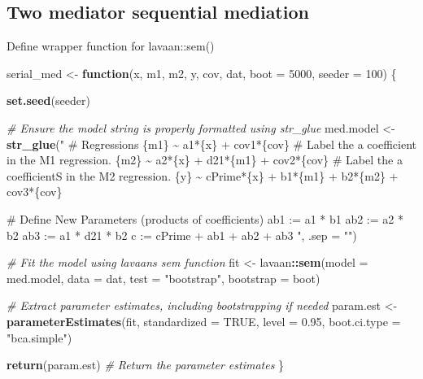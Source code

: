 \documentclass[
]{article}
\newenvironment{Shaded}{\begin{snugshade}}{\end{snugshade}}
\newcommand{\AttributeTok}[1]{\textcolor[rgb]{0.13,0.29,0.53}{#1}}
\newcommand{\CommentTok}[1]{\textcolor[rgb]{0.56,0.35,0.01}{\textit{#1}}}
\newcommand{\ConstantTok}[1]{\textcolor[rgb]{0.56,0.35,0.01}{#1}}
\newcommand{\ControlFlowTok}[1]{\textcolor[rgb]{0.13,0.29,0.53}{\textbf{#1}}}
\newcommand{\DecValTok}[1]{\textcolor[rgb]{0.00,0.00,0.81}{#1}}
\newcommand{\FloatTok}[1]{\textcolor[rgb]{0.00,0.00,0.81}{#1}}
\newcommand{\FunctionTok}[1]{\textcolor[rgb]{0.13,0.29,0.53}{\textbf{#1}}}
\newcommand{\NormalTok}[1]{#1}
\newcommand{\OtherTok}[1]{\textcolor[rgb]{0.56,0.35,0.01}{#1}}
\newcommand{\SpecialCharTok}[1]{\textcolor[rgb]{0.81,0.36,0.00}{\textbf{#1}}}
\newcommand{\StringTok}[1]{\textcolor[rgb]{0.31,0.60,0.02}{#1}}
\begin{document}
\hypertarget{two-mediator-sequential-mediation}{%
\subsection{Two mediator sequential
mediation}\label{two-mediator-sequential-mediation}}

Define wrapper function for lavaan::sem()

\begin{Shaded}
\begin{Highlighting}[]
\NormalTok{serial\_med }\OtherTok{\textless{}{-}} \ControlFlowTok{function}\NormalTok{(x, m1, m2, y, cov, dat, }\AttributeTok{boot =} \DecValTok{5000}\NormalTok{, }\AttributeTok{seeder =} \DecValTok{100}\NormalTok{) \{}
  
  \FunctionTok{set.seed}\NormalTok{(seeder)}
  
  \CommentTok{\# Ensure the model string is properly formatted using str\_glue}
\NormalTok{  med.model }\OtherTok{\textless{}{-}} \FunctionTok{str\_glue}\NormalTok{(}\StringTok{"}
\StringTok{    \# Regressions}
\StringTok{    \{m1\} \textasciitilde{} a1*\{x\} + cov1*\{cov\}  \# Label the a coefficient in the M1 regression.}
\StringTok{    \{m2\} \textasciitilde{} a2*\{x\} + d21*\{m1\} + cov2*\{cov\}  \# Label the a coefficientS in the M2 regression.}
\StringTok{    \{y\} \textasciitilde{} cPrime*\{x\} + b1*\{m1\} + b2*\{m2\} + cov3*\{cov\}}

\StringTok{    \# Define New Parameters (products of coefficients)}
\StringTok{    ab1 := a1 * b1}
\StringTok{    ab2 := a2 * b2}
\StringTok{    ab3 := a1 * d21 * b2}
\StringTok{    c := cPrime + ab1 + ab2 + ab3}
\StringTok{  "}\NormalTok{, }\AttributeTok{.sep =} \StringTok{""}\NormalTok{)}

 \CommentTok{\# Fit the model using lavaan\textquotesingle{}s sem function}
\NormalTok{  fit }\OtherTok{\textless{}{-}}\NormalTok{ lavaan}\SpecialCharTok{::}\FunctionTok{sem}\NormalTok{(}\AttributeTok{model =}\NormalTok{ med.model, }\AttributeTok{data =}\NormalTok{ dat, }\AttributeTok{test =} \StringTok{"bootstrap"}\NormalTok{, }\AttributeTok{bootstrap =}\NormalTok{ boot)}

  \CommentTok{\# Extract parameter estimates, including bootstrapping if needed}
\NormalTok{  param.est }\OtherTok{\textless{}{-}} \FunctionTok{parameterEstimates}\NormalTok{(fit, }\AttributeTok{standardized =} \ConstantTok{TRUE}\NormalTok{, }\AttributeTok{level =} \FloatTok{0.95}\NormalTok{, }\AttributeTok{boot.ci.type =} \StringTok{"bca.simple"}\NormalTok{)}
  
  \FunctionTok{return}\NormalTok{(param.est)  }\CommentTok{\# Return the parameter estimates}
\NormalTok{\}}
\end{Highlighting}
\end{Shaded}
\end{document}
